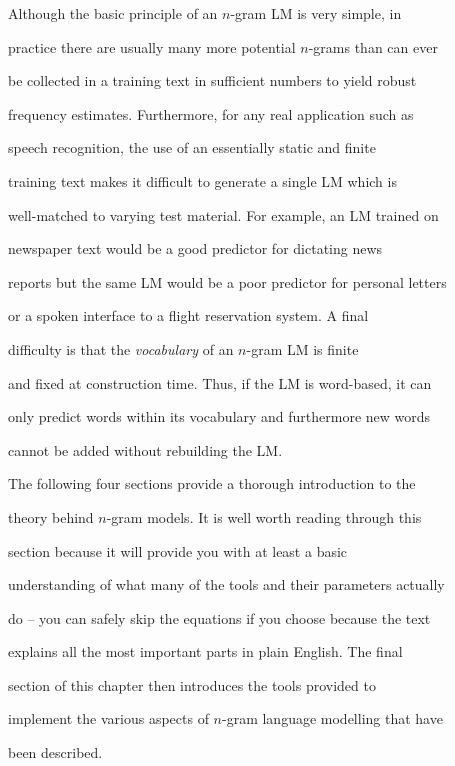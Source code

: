 Although the basic principle of an $n$-gram LM is very simple, in


practice there are usually many more potential $n$-grams than can ever


be collected in a training text in sufficient numbers to yield robust


frequency estimates.  Furthermore, for any real application such as


speech recognition, the use of an essentially static and finite


training text makes it difficult to generate a single LM which is


well-matched to varying test material. For example, an LM trained on


newspaper text would be a good predictor for dictating news


reports but the same LM would be a poor predictor for personal letters


or a spoken interface to a flight reservation system.  A final


difficulty is that the \textit{vocabulary} of an $n$-gram LM is finite


and fixed at construction time.  Thus, if the LM is word-based, it can


only predict words within its vocabulary and furthermore new words


cannot be added without rebuilding the LM.





The following four sections provide a thorough introduction to the


theory behind $n$-gram models.  It is well worth reading through this


section because it will provide you with at least a basic


understanding of what many of the tools and their parameters actually


do -- you can safely skip the equations if you choose because the text


explains all the most important parts in plain English.  The final


section of this chapter then introduces the tools provided to


implement the various aspects of $n$-gram language modelling that have


been described.








